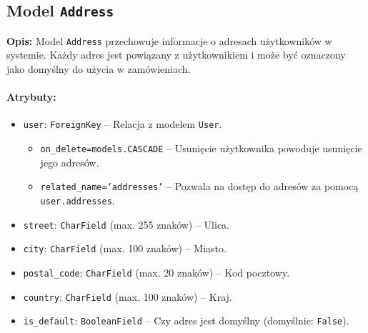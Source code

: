 \documentclass[12pt,a4paper,oneside]{article}
\theoremstyle{definition}
\numberwithin{equation}{section}
\begin{document}
% 
% 
\subsection{Model \texttt{Address}}

\textbf{Opis:}  
Model \texttt{Address} przechowuje informacje o adresach użytkowników w systemie. Każdy adres jest powiązany z użytkownikiem i może być oznaczony jako domyślny do użycia w zamówieniach.

\paragraph{Atrybuty:}
\begin{itemize}
    \item \texttt{user}: \texttt{ForeignKey} – Relacja z modelem \texttt{User}.
    \begin{itemize}
        \item \texttt{on\_delete=models.CASCADE} – Usunięcie użytkownika powoduje usunięcie jego adresów.
        \item \texttt{related\_name='addresses'} – Pozwala na dostęp do adresów za pomocą \texttt{user.addresses}.
    \end{itemize}
    \item \texttt{street}: \texttt{CharField} (max. 255 znaków) – Ulica.
    \item \texttt{city}: \texttt{CharField} (max. 100 znaków) – Miasto.
    \item \texttt{postal\_code}: \texttt{CharField} (max. 20 znaków) – Kod pocztowy.
    \item \texttt{country}: \texttt{CharField} (max. 100 znaków) – Kraj.
    \item \texttt{is\_default}: \texttt{BooleanField} – Czy adres jest domyślny (domyślnie: \texttt{False}).
\end{itemize}
\end{document}
